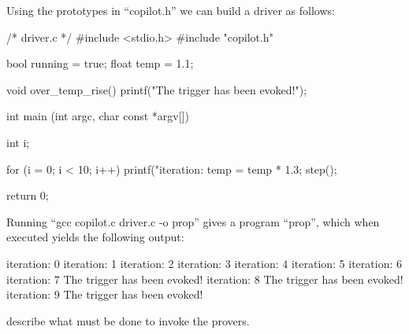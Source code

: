 Using the prototypes in ``copilot.h'' we can build a driver as follows:

\begin{code}
/* driver.c */
#include <stdio.h>
#include "copilot.h"

bool running = true;
float temp = 1.1;

void over_temp_rise()
{
  printf("The trigger has been evoked!\n");
}

int main (int argc, char const *argv[])
{
  int i;

  for (i = 0; i < 10; i++)
  {
    printf("iteration: %
    temp = temp * 1.3;
    step();
  }

  return 0;
}
\end{code}

Running ``gcc copilot.c driver.c -o prop'' gives a program ``prop'', which when executed
yields the following output:
%
\begin{code}
iteration: 0
iteration: 1
iteration: 2
iteration: 3
iteration: 4
iteration: 5
iteration: 6
iteration: 7
The trigger has been evoked!
iteration: 8
The trigger has been evoked!
iteration: 9
The trigger has been evoked!
\end{code}
%

 describe what must be done to invoke the provers. 